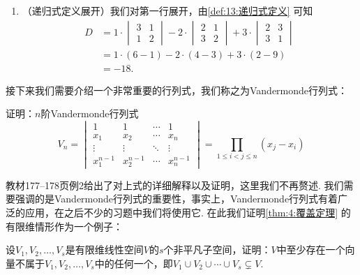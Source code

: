 \begin{solution}
\begin{enumerate}
        \item （递归式定义展开）我们对第一行展开，由\autoref{def:13:递归式定义} 可知
              \begin{align*}
                  D & =1 \cdot
                  \begin{vmatrix}
                      3 & 1 \\
                      1 & 2
                  \end{vmatrix}-2
                  \cdot \begin{vmatrix}
                            2 & 1 \\
                            3 & 2
                        \end{vmatrix}+3
                  \cdot \begin{vmatrix}
                            2 & 3 \\
                            3 & 1
                        \end{vmatrix}                           \\
                    & =1 \cdot (6-1)-2 \cdot (4-3)+3 \cdot (2-9) \\
                    & =-18.
              \end{align*}
    \end{enumerate}
\end{solution}

接下来我们需要介绍一个非常重要的行列式，我们称之为Vandermonde行列式：
\begin{example}
    证明：$n$阶Vandermonde行列式
    \[V_n=\begin{vmatrix}
            1         & 1         & \cdots & 1         \\
            x_1       & x_2       & \cdots & x_n       \\
            \vdots    & \vdots    & \ddots & \vdots    \\
            x_1^{n-1} & x_2^{n-1} & \cdots & x_n^{n-1}
        \end{vmatrix}=\prod_{1 \leqslant i < j \leqslant n}(x_j-x_i)\]
\end{example}

教材177--178页例2给出了对上式的详细解释以及证明，这里我们不再赘述. 我们需要强调的是Vandermonde行列式的重要性，事实上，Vandermonde行列式有着广泛的应用，在之后不少的习题中我们将使用它. 在此我们证明\autoref{thm:4:覆盖定理} 的有限维情形作为一个例子：
\begin{example}\label{ex:13:行列式证明覆盖定理}
    设$V_1,V_2,\ldots,V_s$是有限维线性空间$V$的$s$个非平凡子空间，证明：$V$中至少存在一个向量不属于$V_1,V_2,\ldots,V_s$中的任何一个，即$V_1 \cup V_2 \cup \cdots \cup V_s\subsetneq V.$
\end{example}

